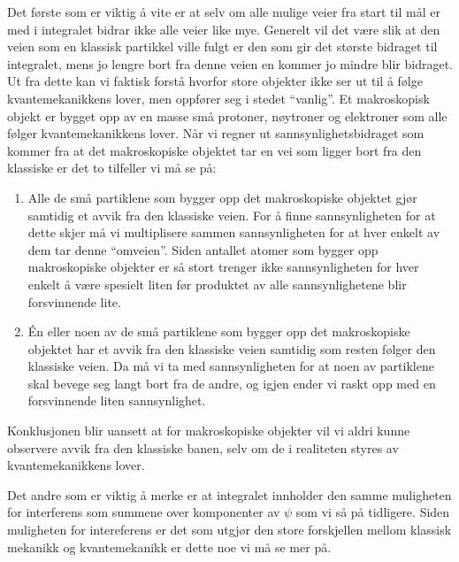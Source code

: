 Det første som er viktig å vite er at selv om alle mulige veier fra start til mål er med i integralet bidrar ikke alle veier like mye. Generelt vil det være slik at den veien som en klassisk partikkel ville fulgt er den som gir det største bidraget til integralet, mens jo lengre bort fra denne veien en kommer jo mindre blir bidraget. Ut fra dette kan vi faktisk forstå hvorfor store objekter ikke ser ut til å følge kvantemekanikkens lover, men oppfører seg i stedet ``vanlig''. Et makroskopisk objekt er bygget opp av en masse små protoner, nøytroner og elektroner som alle følger kvantemekanikkens lover. Når vi regner ut sannsynlighetsbidraget som kommer fra at det makroskopiske objektet tar en vei som ligger bort fra den klassiske er det to tilfeller vi må se på:
\begin{enumerate}
\item
Alle de små partiklene som bygger opp det makroskopiske objektet gjør samtidig et avvik fra den klassiske veien. For å finne sannsynligheten for at dette skjer må vi multiplisere sammen sannsynligheten for at hver enkelt av dem tar denne ``omveien''. Siden antallet atomer som bygger opp makroskopiske objekter er så stort trenger ikke sannsynligheten for hver enkelt å være spesielt liten før produktet av alle sannsynlighetene blir forsvinnende lite.
\item
\'En eller noen av de små partiklene som bygger opp det makroskopiske objektet har et avvik fra den klassiske veien samtidig som resten følger den klassiske veien. Da må vi ta med sannsynligheten for at noen av partiklene skal bevege seg langt bort fra de andre, og igjen ender vi raskt opp med en forsvinnende liten sannsynlighet.
\end{enumerate}
Konklusjonen blir uansett at for makroskopiske objekter vil vi aldri kunne observere avvik fra den klassiske banen, selv om de i realiteten styres av kvantemekanikkens lover.

Det andre som er viktig å merke er at integralet innholder den samme muligheten for interferens som summene over komponenter av $\psi$ som vi så på tidligere. Siden muligheten for intereferens er det som utgjør den store forskjellen mellom klassisk mekanikk og kvantemekanikk er dette noe vi må se mer på.

